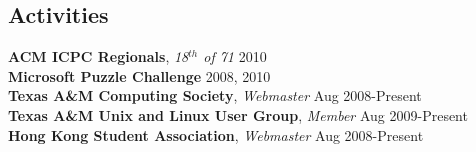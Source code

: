 \documentclass[margin,line]{res}
\newenvironment{list2}{
  \begin{list}{$\bullet$}{%
      \setlength{\itemsep}{0in}
      \setlength{\parsep}{0in} \setlength{\parskip}{0in}
      \setlength{\topsep}{0in} \setlength{\partopsep}{0in} 
      \setlength{\leftmargin}{0.2in}}}{\end{list}}
\begin{document}
\begin{resume}
%
%
\section{\sc Activities}
{\bf ACM ICPC Regionals}, {\em 18$^{th}$ of 71} \hfill 2010 \\
{\bf Microsoft Puzzle Challenge} \hfill 2008, 2010 \\
{\bf Texas A\&M Computing Society}, {\em Webmaster} \hfill Aug 2008-Present \\
{\bf Texas A\&M Unix and Linux User Group}, {\em Member} \hfill Aug 2009-Present \\
{\bf Hong Kong Student Association}, {\em Webmaster} \hfill Aug 2008-Present

%
%


\end{resume}
\end{document}

